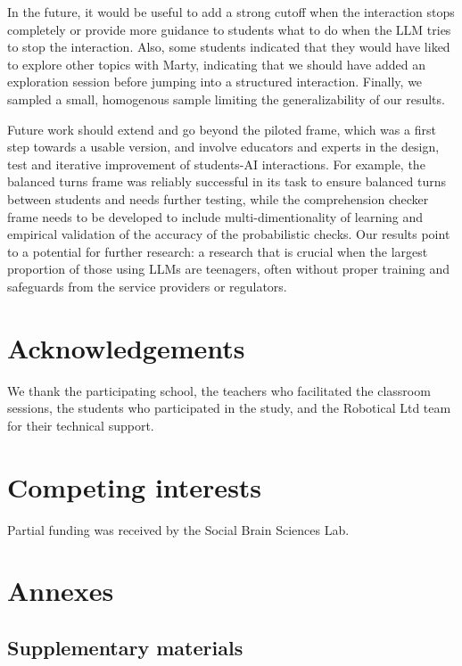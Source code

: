 \documentclass[fleqn,10pt]{wlscirep}
\begin{document}
In the future, it would be useful to add a strong cutoff when the interaction stops completely or provide more guidance to students what to do when the LLM tries to stop the interaction. Also, some students indicated that they would have liked to explore other topics with Marty, indicating that we should have added an exploration session before jumping into a structured interaction. Finally, we sampled a small, homogenous sample limiting the generalizability of our results.

Future work should extend and go beyond the piloted frame, which was a first step towards a usable version, and involve educators and experts in the design, test and iterative improvement of students-AI interactions. For example, the balanced turns frame was reliably successful in its task to ensure balanced turns between students and needs further testing, while the comprehension checker frame needs to be developed to include multi-dimentionality of learning and empirical validation of the accuracy of the probabilistic checks. Our results point to a potential for further research: a research that is crucial when the largest proportion of those using LLMs are teenagers, often without proper training and safeguards from the service providers or regulators.

\section*{Acknowledgements}

We thank the participating school, the teachers who facilitated the classroom sessions, the students who participated in the study, and the Robotical Ltd team for their technical support.

\section*{Competing interests}

Partial funding was received by the Social Brain Sciences Lab.



\section*{Annexes}

\subsection*{Supplementary materials}
\end{document}
